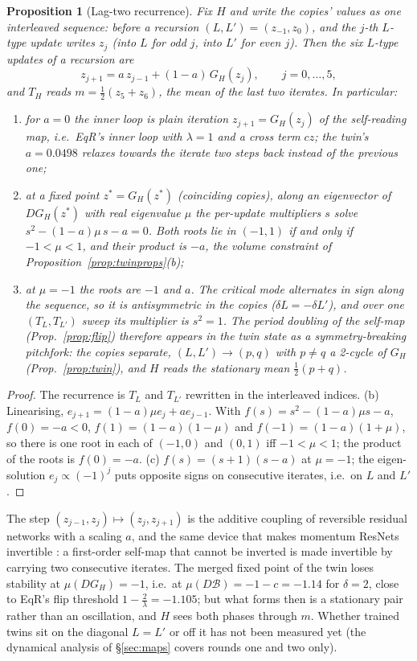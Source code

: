\documentclass[11pt]{article}
\newtheorem{proposition}{Proposition}
\theoremstyle{definition}
\newcommand{\Bk}{\mathcal{B}}
\begin{document}
\begin{proposition}[Lag-two recurrence]\label{prop:lag2}
Fix $H$ and write the copies' values as one interleaved sequence: before a recursion $(L,L')=(z_{-1},z_0)$, and the $j$-th $L$-type update
writes $z_j$ (into $L$ for odd $j$, into $L'$ for even $j$). Then the six $L$-type updates of a recursion are
\[
z_{j+1}=a\,z_{j-1}+(1-a)\,G_H(z_j),\qquad j=0,\dots,5,
\]
and $T_H$ reads $m=\frac12(z_5+z_6)$, the mean of the last two iterates. In particular:
\begin{enumerate}[label=(\alph*),itemsep=0pt]
\item for $a=0$ the inner loop is plain iteration $z_{j+1}=G_H(z_j)$ of the self-reading map, i.e.\ EqR's inner loop with $\lambda=1$ and a
cross term $cz$; the twin's $a=0.0498$ relaxes towards the iterate \emph{two} steps back instead of the previous one;
\item at a fixed point $z^\ast=G_H(z^\ast)$ (coinciding copies), along an eigenvector of $DG_H(z^\ast)$ with real eigenvalue $\mu$ the
per-update multipliers $s$ solve $s^2-(1-a)\mu\,s-a=0$. Both roots lie in $(-1,1)$ if and only if $-1<\mu<1$, and their product is $-a$, the
volume constraint of Proposition~\ref{prop:twinprops}(b);
\item at $\mu=-1$ the roots are $-1$ and $a$. The critical mode alternates in sign along the sequence, so it is antisymmetric in the
copies ($\delta L=-\delta L'$), and over one $(T_L,T_{L'})$ sweep its multiplier is $s^2=1$. The period doubling of the self-map (Prop.~\ref{prop:flip}) therefore appears in the
twin state as a symmetry-breaking pitchfork: the copies separate, $(L,L')\to(p,q)$ with $p\ne q$ a 2-cycle of $G_H$ (Prop.~\ref{prop:twin}), and
$H$ reads the stationary mean $\frac12(p+q)$.
\end{enumerate}
\end{proposition}
\begin{proof}The recurrence is $T_L$ and $T_{L'}$ rewritten in the interleaved indices. (b) Linearising, $e_{j+1}=(1-a)\mu e_j+ae_{j-1}$. With
$f(s)=s^2-(1-a)\mu s-a$, $f(0)=-a<0$, $f(1)=(1-a)(1-\mu)$ and $f(-1)=(1-a)(1+\mu)$, so there is one root in each of $(-1,0)$ and $(0,1)$ iff
$-1<\mu<1$; the product of the roots is $f(0)=-a$. (c) $f(s)=(s+1)(s-a)$ at $\mu=-1$; the eigen-solution $e_j\propto(-1)^j$ puts opposite signs
on consecutive iterates, i.e.\ on $L$ and $L'$.\end{proof}

\noindent The step $(z_{j-1},z_j)\mapsto(z_j,z_{j+1})$ is the additive coupling of reversible residual networks \cite{gomez2017revnet} with a
scaling $a$, and the same device that makes momentum ResNets invertible \cite{sander2021momentum}: a first-order self-map that cannot be
inverted is made invertible by carrying two consecutive iterates. The merged fixed point of the twin loses stability at
$\mu(DG_H)=-1$, i.e.\ at $\mu(D\Bk)=-1-c=-1.14$ for $\delta=2$, close to EqR's flip threshold $1-\frac2\lambda=-1.105$; but what forms then is a
stationary pair rather than an oscillation, and $H$ sees both phases through $m$. Whether trained twins sit on the diagonal $L=L'$ or off it
has not been measured yet (the dynamical analysis of \S\ref{sec:maps} covers rounds one and two only).
\end{document}
